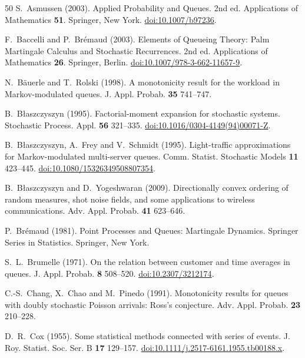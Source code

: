 \documentclass[aap,preprint]{imsart}
\numberwithin{equation}{section}
\theoremstyle{plain}
\theoremstyle{definition}
\newcommand{\1}{\mathbf 1}
\begin{document}
\begin{thebibliography}{50}
S.~Asmussen (2003).
Applied Probability and Queues.
2nd ed. Applications of Mathematics \textbf{51}. Springer, New York.
\href{https://doi.org/10.1007/b97236}{doi:10.1007/b97236}.

F.~Baccelli and P.~Br\'emaud (2003).
Elements of Queueing Theory: Palm Martingale Calculus and Stochastic Recurrences.
2nd ed. Applications of Mathematics \textbf{26}. Springer, Berlin.
\href{https://doi.org/10.1007/978-3-662-11657-9}{doi:10.1007/978-3-662-11657-9}.

N.~B\"auerle and T.~Rolski (1998).
A monotonicity result for the workload in Markov-modulated queues.
J. Appl. Probab. \textbf{35} 741--747.

B.~B{\l}aszczyszyn (1995).
Factorial-moment expansion for stochastic systems.
Stochastic Process. Appl. \textbf{56} 321--335.
\href{https://doi.org/10.1016/0304-4149(94)00071-Z}{doi:10.1016/0304-4149(94)00071-Z}.

B.~B{\l}aszczyszyn, A.~Frey and V.~Schmidt (1995).
Light-traffic approximations for Markov-modulated multi-server queues.
Comm. Statist. Stochastic Models \textbf{11} 423--445.
\href{https://doi.org/10.1080/15326349508807354}{doi:10.1080/15326349508807354}.

B.~B{\l}aszczyszyn and D.~Yogeshwaran (2009).
Directionally convex ordering of random measures, shot noise fields, and some applications to wireless communications.
Adv. Appl. Probab. \textbf{41} 623--646.

P.~Br\'emaud (1981).
Point Processes and Queues: Martingale Dynamics.
Springer Series in Statistics. Springer, New York.

S.~L.~Brumelle (1971).
On the relation between customer and time averages in queues.
J. Appl. Probab. \textbf{8} 508--520.
\href{https://doi.org/10.2307/3212174}{doi:10.2307/3212174}.

C.-S.~Chang, X.~Chao and M.~Pinedo (1991).
Monotonicity results for queues with doubly stochastic Poisson arrivals: Ross's conjecture.
Adv. Appl. Probab. \textbf{23} 210--228.

D.~R.~Cox (1955).
Some statistical methods connected with series of events.
J. Roy. Statist. Soc. Ser. B \textbf{17} 129--157.
\href{https://doi.org/10.1111/j.2517-6161.1955.tb00188.x}{doi:10.1111/j.2517-6161.1955.tb00188.x}.


\end{thebibliography}
\end{document}
